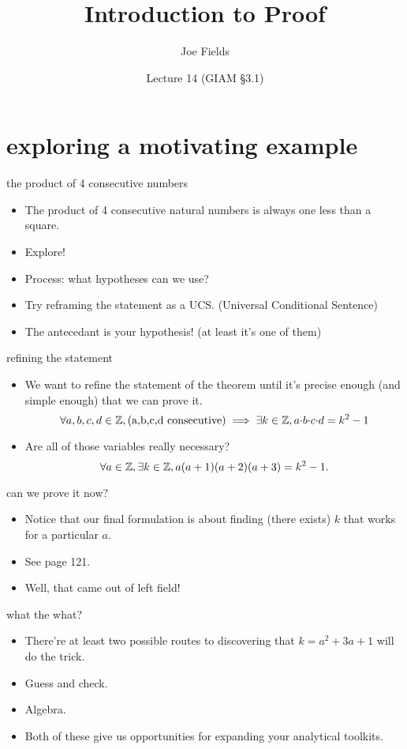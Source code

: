 \documentclass[landscape]{beamer}
\author{Joe Fields}
\title{Introduction to Proof}
\date{Lecture 14 (GIAM \S 3.1)}
\institute[SCSU]{ {\tt fieldsj1@southernct.edu} }
\begin{document}
\begin{frame}[plain]
  \titlepage
\end{frame}

\section{exploring a motivating example}

\begin{frame}{the product of 4 consecutive numbers}
\begin{itemize}
\item The product of 4 consecutive natural numbers is always one less than a square. \pause
\item Explore! \pause
\item Process: what hypotheses can we use? \pause
\item Try reframing the statement as a UCS. \pause (Universal Conditional Sentence) \pause
\item The antecedant is your hypothesis! \pause (at least it's one of them) 
\end{itemize}
\end{frame}

\begin{frame}{refining the statement}
\begin{itemize}
\item We want to refine the statement of the theorem until it's precise enough (and simple enough) that we can prove it. \pause
\[ \forall a,b,c,d \in {\mathbb Z}, (\mbox{a,b,c,d  consecutive}) 
\implies \exists k \in {\mathbb Z}, a{\cdot}b{\cdot}c{\cdot}d = k^2 -1 
\]
\pause
\item Are all of those variables really necessary? \pause
\[ \forall a \in {\mathbb Z}, \exists k \in {\mathbb Z}, a(a+1)(a+2)(a+3) = k^2 - 1. \]
\end{itemize}
\end{frame}

\begin{frame}{can we prove it now?}
\begin{itemize}
\item Notice that our final formulation is about finding (there exists) $k$ that works for a particular $a$. \pause
\item See page 121. \pause
\item Well, that came out of left field!
\end{itemize}
\end{frame}

\begin{frame}{what the what?}
\begin{itemize}
\item There're at least two possible routes to discovering that $k=a^2+3a+1$ will do the trick. \pause
\item Guess and check. \pause 
\item Algebra. \pause 
\item Both of these give us opportunities for expanding your analytical toolkits.
\end{itemize}
\end{frame}
\end{document}
